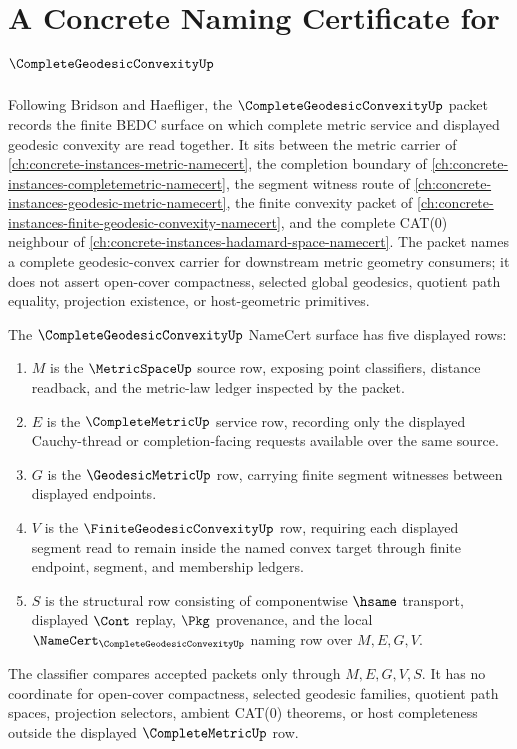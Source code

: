 \chapter{A Concrete Naming Certificate for $\CompleteGeodesicConvexityUp$}
\label{ch:concrete-instances-complete-geodesic-convexity-namecert}

Following Bridson and Haefliger, the $\CompleteGeodesicConvexityUp$ packet records the finite BEDC surface on which complete metric service and displayed geodesic convexity are read together. It sits between the metric carrier of \autoref{ch:concrete-instances-metric-namecert}, the completion boundary of \autoref{ch:concrete-instances-completemetric-namecert}, the segment witness route of \autoref{ch:concrete-instances-geodesic-metric-namecert}, the finite convexity packet of \autoref{ch:concrete-instances-finite-geodesic-convexity-namecert}, and the complete CAT(0) neighbour of \autoref{ch:concrete-instances-hadamard-space-namecert}. The packet names a complete geodesic-convex carrier for downstream metric geometry consumers; it does not assert open-cover compactness, selected global geodesics, quotient path equality, projection existence, or host-geometric primitives.

\begin{definition}
\label{def:complete-geodesic-convexity-surface}
The $\CompleteGeodesicConvexityUp$ NameCert surface has five displayed rows:
\begin{enumerate}
\item $M$ is the $\MetricSpaceUp$ source row, exposing point classifiers, distance readback, and the metric-law ledger inspected by the packet.
\item $E$ is the $\CompleteMetricUp$ service row, recording only the displayed Cauchy-thread or completion-facing requests available over the same source.
\item $G$ is the $\GeodesicMetricUp$ row, carrying finite segment witnesses between displayed endpoints.
\item $V$ is the $\FiniteGeodesicConvexityUp$ row, requiring each displayed segment read to remain inside the named convex target through finite endpoint, segment, and membership ledgers.
\item $S$ is the structural row consisting of componentwise $\hsame$ transport, displayed $\Cont$ replay, $\Pkg$ provenance, and the local $\NameCert_{\CompleteGeodesicConvexityUp}$ naming row over $M,E,G,V$.
\end{enumerate}
The classifier compares accepted packets only through $M,E,G,V,S$. It has no coordinate for open-cover compactness, selected geodesic families, quotient path spaces, projection selectors, ambient CAT(0) theorems, or host completeness outside the displayed $\CompleteMetricUp$ row.
\end{definition}

